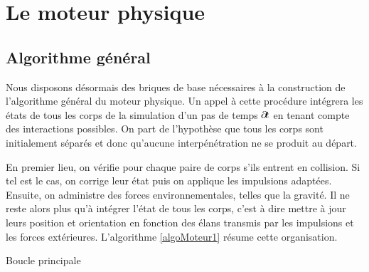 \section{Le moteur physique}

\subsection{Algorithme général}

Nous disposons désormais des briques de base nécessaires à la
construction de l'algorithme général du moteur physique. Un appel à
cette procédure intégrera les états de tous les corps de la simulation
d'un pas de temps $\partial \! t$ en tenant compte des interactions
possibles. On part de l'hypothèse que tous les corps sont initialement
séparés et donc qu'aucune interpénétration ne se produit au départ.

En premier lieu, on vérifie pour chaque paire de corps s'ils entrent
en collision. Si tel est le cas, on corrige leur état puis on applique
les impulsions adaptées. Ensuite, on administre des forces
environnementales, telles que la gravité. Il ne reste alors plus qu'à
intégrer l'état de tous les corps, c'est à dire mettre à jour leurs
position et orientation en fonction des élans transmis par les
impulsions et les forces extérieures. L'algorithme \ref{algoMoteur1}
résume cette organisation.

\begin{algorithm}[h]
  \caption{Boucle principale}
  \label{algoMoteur1}
  \dontprintsemicolon
  \BlankLine
  \BlankLine
  \BlankLine
\end{algorithm}

